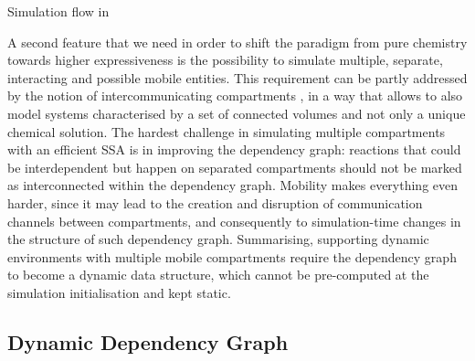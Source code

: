 \documentclass[12pt,a4paper,twoside,openright]{book}
\begin{document}
\begin{algorithm}
\begin{distribalgo}[1]
\vspace{5pt}
  \ENDFOR
\ENDFOR
{}
      \ENDFOR
    \ENDIF
\ENDWHILE
\caption{Simulation flow in \alchemist{}}
\label{algo:engine}
\end{distribalgo}
\end{algorithm}

A second feature that we need in order to shift the paradigm from pure chemistry towards higher expressiveness is the possibility to simulate multiple, separate, interacting and possible mobile entities.
%
This requirement can be partly addressed by the notion of intercommunicating compartments \cite{CiocchettaH09,versari08,montagna-cs2bio10,btssoc-jos7}, in a way that allows to also model systems characterised by a set of connected volumes and not only a unique chemical solution.
%
The hardest challenge in simulating multiple compartments with an efficient SSA is in improving the dependency graph: reactions that could be interdependent but happen on separated compartments should not be marked as interconnected within the dependency graph.
%
Mobility makes everything even harder, since it may lead to the creation and disruption of communication channels between compartments, and consequently to simulation-time changes in the structure of such dependency graph.
%
Summarising, supporting dynamic environments with multiple mobile compartments require the dependency graph to become a dynamic data structure, which cannot be pre-computed at the simulation initialisation and kept static.

\subsection{Dynamic Dependency Graph}
\end{document}
